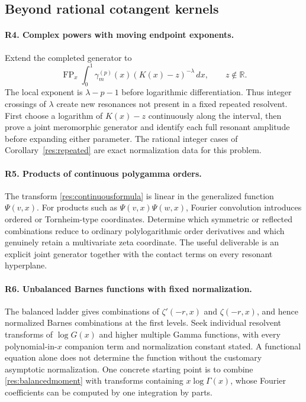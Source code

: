 \subsection{Beyond rational cotangent kernels}

\paragraph{R4. Complex powers with moving endpoint exponents.}
Extend the completed generator to
\[
 \operatorname{FP}_x\int_0^1
     \gamma_m^{(p)}(x)(K(x)-z)^{-\lambda}\,dx,
 \qquad z\notin\mathbb R.
\]
The local exponent is $\lambda-p-1$ before logarithmic
differentiation. Thus integer crossings of $\lambda$
create new resonances not present in a fixed repeated
resolvent. First choose a logarithm of $K(x)-z$
continuously along the interval, then prove a joint
meromorphic generator and identify each full resonant
amplitude before expanding either parameter. The rational
integer cases of Corollary~\ref{res:repeated} are exact
normalization data for this problem.

\paragraph{R5. Products of continuous polygamma orders.}
The transform \eqref{res:continuousformula} is linear in
the generalized function $\Psi(v,x)$. For products such
as $\Psi(v,x)\Psi(w,x)$, Fourier convolution introduces
ordered or Tornheim-type coordinates. Determine which
symmetric or reflected combinations reduce to ordinary
polylogarithmic order derivatives and which genuinely
retain a multivariate zeta coordinate. The useful
deliverable is an explicit joint generator together with
the contact terms on every resonant hyperplane.

\paragraph{R6. Unbalanced Barnes functions with fixed normalization.}
The balanced ladder gives combinations of
$\zeta'(-r,x)$ and $\zeta(-r,x)$, and hence normalized
Barnes combinations at the first levels. Seek individual
resolvent transforms of $\log G(x)$ and higher multiple
Gamma functions, with every polynomial-in-$x$ companion
term and normalization constant stated. A functional
equation alone does not determine the function without
the customary asymptotic normalization. One concrete
starting point is to combine \eqref{res:balancedmoment}
with transforms containing $x\log\Gamma(x)$, whose
Fourier coefficients can be computed by one integration
by parts.

